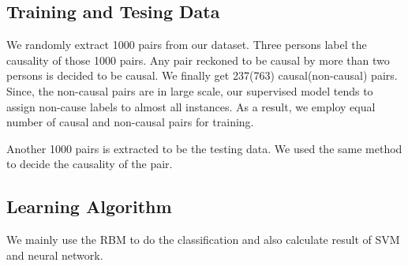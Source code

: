 \subsection{Training and Tesing Data}
We randomly extract 1000 pairs from our dataset. 
Three persons label the causality of those 1000 pairs. Any pair reckoned to be causal by more than two persons is decided to be causal.
We finally get 237(763) causal(non-causal) pairs.
Since, the non-causal pairs are in large scale, our supervised model tends to assign non-cause labels to almost all instances.
As a result, we employ equal number of causal and non-causal pairs for training.

Another 1000 pairs is extracted to be the testing data. We used the same method to decide the causality of the pair.

\subsection{Learning Algorithm}
We mainly use the RBM to do the classification and also calculate result of SVM and neural network.





